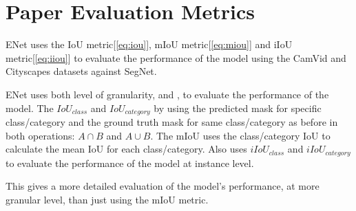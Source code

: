\section{Paper Evaluation Metrics}

  ENet\cite{paszke2016enet} uses the IoU metric[\ref{eq:iou}], mIoU metric[\ref{eq:miou}]
  and iIoU metric[\ref{eq:iiou}] to evaluate the performance of the model using the CamVid and Cityscapes
  datasets\cite{cordts2016cityscapes} against SegNet\cite{badrinarayanan2017segnet}.
  
  ENet uses both level of granularity,  and , to evaluate the performance
  of the model. The $IoU_{class}$ and $IoU_{category}$ by using the predicted mask for specific class/category and the
  ground truth mask for same class/category as before in both operations: $A \cap B$ and $A \cup B$.
  The mIoU uses the class/category IoU to calculate the mean IoU for each class/category.
  Also uses $iIoU_{class}$ and $iIoU_{category}$ to evaluate the performance of the 
  model at instance level.

  This gives a more detailed evaluation of the model's performance, at more
  granular level, than just using the mIoU metric.
